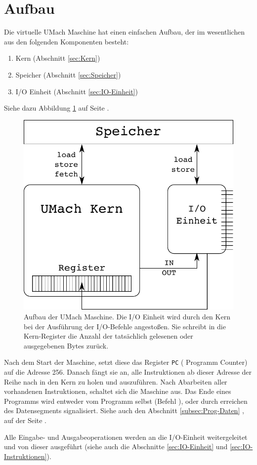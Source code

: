 \section{Aufbau}
\label{sec:Aufbau}

Die virtuelle UMach Maschine hat einen einfachen Aufbau, der im
wesentlichen aus den folgenden Komponenten besteht:
\begin{enumerate}
 \item Kern (Abschnitt \ref{sec:Kern})
 \item Speicher (Abschnitt \ref{sec:Speicher})
 \item I/O Einheit (Abschnitt \ref{sec:IO-Einheit})
\end{enumerate}

Siehe dazu Abbildung \ref{fig:umach-aufbau} auf Seite
\pageref{fig:umach-aufbau}.

\begin{figure}[htp]
 \centering
 \includegraphics{./img/UMach-Aufbau.pdf}
 \caption[Aufbau der UMach Maschine]
         {Aufbau der UMach Maschine. Die I/O Einheit wird durch den Kern bei
          der Ausführung der I/O-Befehle angestoßen. Sie schreibt in die
          Kern-Register die Anzahl der tatsächlich gelesenen oder ausgegebenen
          Bytes zurück.}
 \label{fig:umach-aufbau}
\end{figure}


Nach dem Start der Maschine, setzt diese das Register \texttt{PC} (\glqq
Programm Counter\grqq) auf die Adresse 256. Danach fängt sie an, alle
Instruktionen ab dieser Adresse der Reihe nach in den Kern zu holen und
auszuführen. Nach Abarbeiten aller vorhandenen Instruktionen, schaltet sich die
Maschine aus. Das Ende eines Programms wird entweder vom Programm selbst
(Befehl ), oder durch erreichen des Datensegments signalisiert.
Siehe auch den Abschnitt \ref{subsec:Prog-Daten} ,
auf der Seite \pageref{subsec:Prog-Daten}. 


Alle Eingabe- und Ausgabeoperationen werden an die I/O-Einheit weitergeleitet
und von dieser ausgeführt (siehe auch die Abschnitte \ref{sec:IO-Einheit} und
\ref{sec:IO-Instruktionen}).




